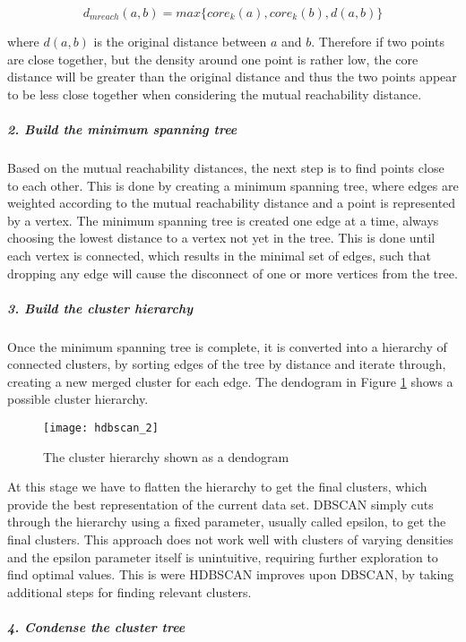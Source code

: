 \begin{equation*}
    d_{mreach}(a, b) = max\{core_k(a), core_k(b), d(a, b)\}
\end{equation*}

where $d(a, b)$ is the original distance between $a$ and $b$. Therefore if two points are close together, but the density around one point is rather low, the core distance will be greater than the original distance and thus the two points appear to be less close together when considering the mutual reachability distance.

\subparagraph{2. Build the minimum spanning tree}

Based on the mutual reachability distances, the next step is to find points close  to each other. This is done by creating a minimum spanning tree, where edges are weighted according to the mutual reachability distance and a point is represented by a vertex. The minimum spanning tree is created one edge at a time, always choosing the lowest distance to a vertex not yet in the tree. This is done until each vertex is connected, which results in the minimal set of edges, such that dropping any edge will cause the disconnect of one or more vertices from the tree.

\subparagraph{3. Build the cluster hierarchy}

Once the minimum spanning tree is complete, it is converted into a hierarchy of connected clusters, by sorting edges of the tree by distance and iterate through, creating a new merged cluster for each edge. The dendogram in Figure \ref{fig:hdbscan_2} shows a possible cluster hierarchy. %

\begin{figure}[h]
    \centering
    \texttt{[image: hdbscan\_2]}
    \caption{The cluster hierarchy shown as a dendogram}
    \label{fig:hdbscan_2}
\end{figure}

At this stage we have to flatten the hierarchy to get the final clusters, which provide the best representation of the current data set. DBSCAN simply cuts through the hierarchy using a fixed parameter, usually called epsilon, to get the final clusters. This approach does not work well with clusters of varying densities and the epsilon parameter itself is unintuitive, requiring further exploration to find optimal values. This is were HDBSCAN improves upon DBSCAN, by taking additional steps for finding relevant clusters.

\subparagraph{4. Condense the cluster tree}

